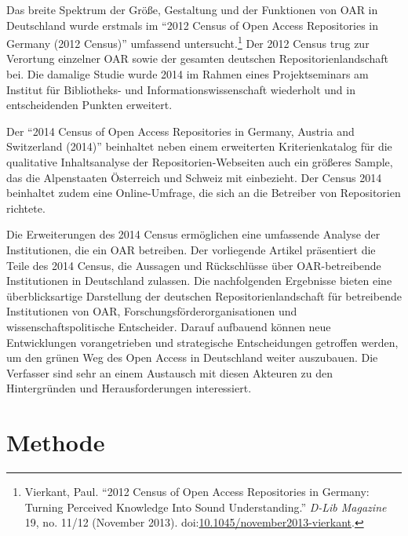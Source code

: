 \documentclass[a4paper,
fontsize=11pt,
oneside,
numbers=noperiodatend,
parskip=half-,
bibliography=totoc,
final
]{scrartcl}
\begin{document}
Das breite Spektrum der Größe, Gestaltung und der Funktionen von OAR in
Deutschland wurde erstmals im \enquote{2012 Census of Open Access
Repositories in Germany (2012 Census)} umfassend untersucht.\footnote{Vierkant,
  Paul. \enquote{2012 Census of Open Access Repositories in Germany:
  Turning Perceived Knowledge Into Sound Understanding.} \emph{D-Lib
  Magazine} 19, no. 11/12 (November 2013).
  doi:\href{http:doi.org/10.1045/november2013-vierkant}{10.1045/november2013-vierkant}.}
Der 2012 Census trug zur Verortung einzelner OAR sowie der gesamten
deutschen Repositorienlandschaft bei. Die damalige Studie wurde 2014 im
Rahmen eines Projektseminars am Institut für Bibliotheks- und
Informationswissenschaft wiederholt und in entscheidenden Punkten
erweitert.

Der \enquote{2014 Census of Open Access Repositories in Germany, Austria
and Switzerland (2014)} beinhaltet neben einem erweiterten
Kriterienkatalog für die qualitative Inhaltsanalyse der
Repositorien-Webseiten auch ein größeres Sample, das die Alpenstaaten
Österreich und Schweiz mit einbezieht. Der Census 2014 beinhaltet zudem
eine Online-Umfrage, die sich an die Betreiber von Repositorien
richtete.

Die Erweiterungen des 2014 Census ermöglichen eine umfassende Analyse
der Institutionen, die ein OAR betreiben. Der vorliegende Artikel
präsentiert die Teile des 2014 Census, die Aussagen und Rückschlüsse
über OAR-betreibende Institutionen in Deutschland zulassen. Die
nachfolgenden Ergebnisse bieten eine überblicksartige Darstellung der
deutschen Repositorienlandschaft für betreibende Institutionen von OAR,
Forschungsförderorganisationen und wissenschaftspolitische Entscheider.
Darauf aufbauend können neue Entwicklungen vorangetrieben und
strategische Entscheidungen getroffen werden, um den grünen Weg des Open
Access in Deutschland weiter auszubauen. Die Verfasser sind sehr an
einem Austausch mit diesen Akteuren zu den Hintergründen und
Herausforderungen interessiert.

\section*{Methode}\label{methode}
\end{document}
